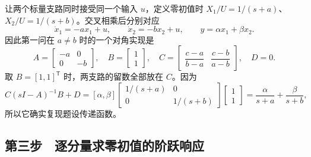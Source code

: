 让两个标量支路同时接受同一个输入 $u$，定义零初值时 $X_1/U=1/(s+a)$、$X_2/U=1/(s+b)$。交叉相乘后分别对应
\[
 \dot x_1=-ax_1+u,\qquad \dot x_2=-bx_2+u,\qquad
 y=\alpha x_1+\beta x_2.
\]
因此第一问在 $a\ne b$ 时的一个对角实现是
\[
 \boxed{
 A=\begin{bmatrix}-a&0\\0&-b\end{bmatrix},\quad
 B=\begin{bmatrix}1\\1\end{bmatrix},\quad
 C=\begin{bmatrix}\dfrac{c-a}{b-a}&\dfrac{c-b}{a-b}\end{bmatrix},\quad D=0.
 }
\]
取 $B=[1,1]^{\mathsf T}$ 时，两支路的留数全部放在 $C$。因为
\[
 C(sI-A)^{-1}B+D
   =[\alpha,\beta]
     \begin{bmatrix}1/(s+a)&0\\0&1/(s+b)\end{bmatrix}
     \begin{bmatrix}1\\1\end{bmatrix}
   =\frac{\alpha}{s+a}+\frac{\beta}{s+b},
\]
所以它确实复现题设传递函数。

\subsection{第三步　逐分量求零初值的阶跃响应}

